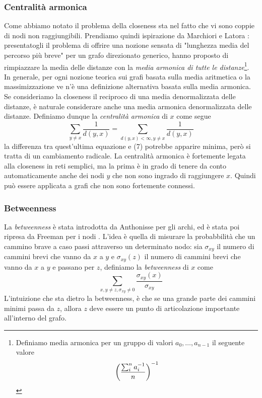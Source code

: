\subsubsection{Centralità armonica}
Come abbiamo notato il problema della closeness sta nel fatto che vi sono coppie di nodi non raggiungibili. Prendiamo quindi ispirazione da Marchiori e Latora %
: presentatogli il problema di offrire una nozione sensata di "lunghezza media del percorso più breve" per un grafo direzionato generico, hanno proposto di rimpiazzare la media delle distanze con la \textit{media armonica di tutte le distanze}\footnote{Definiamo media armonica per un gruppo di valori $a_0, \dots, a_{n - 1}$ il seguente valore
\begin{equation*}
    \left(\frac{\sum_i^n{a_i^{-1}}}{n}\right)^{-1}
\end{equation*}
}.\\
In generale, per ogni nozione teorica sui grafi basata sulla media aritmetica o la massimizzazione ve n'è una definizione alternativa basata sulla media armonica. Se consideriamo la closeness il reciproco di una media denormalizzata delle distanze, è naturale considerare anche una media armonica denormalizzata delle distanze. Definiamo dunque la \textit{centralità armonica} di $x$ come segue
\begin{equation}
    \sum_{y \neq x}{\frac{1}{d(y, x)}} = \sum_{d(y, x) < \infty, y \neq x}{\frac{1}{d(y, x)}}
\end{equation}
la differenza tra quest'ultima equazione e (7) potrebbe apparire minima, però si tratta di un cambiamento radicale. La centralità armonica è fortemente legata alla closeness in reti semplici, ma la prima è in grado di tenere da conto automaticamente anche dei nodi $y$ che non sono ingrado di raggiungere $x$. Quindi può essere applicata a grafi che non sono fortemente connessi.
\subsubsection{Betweenness}
La \textit{betweenness} è stata introdotta da Anthonisse %
per gli archi, ed è stata poi ripresa da Freeman per i nodi %
. L'idea è quella di misurare la probabbilità che un cammino brave a caso passi attraverso un determinato nodo: sia $\sigma_{xy}$ il numero di cammini brevi che vanno da $x$ a $y$ e $\sigma_{xy}(z)$ il numero di cammini brevi che vanno da $x$ a $y$ e passano per $z$, definiamo la \textit{betweenness} di $x$ come
\begin{equation*}
    \sum_{x, y \neq z, \sigma_{xy} \neq 0}{\frac{\sigma_{xy}(x)}{\sigma_{xy}}}
\end{equation*}
L'intuizione che sta dietro la betweenness, è che se una grande parte dei cammini minimi passa da $z$, allora $z$ deve essere un punto di articolazione importante all'interno del grafo.
